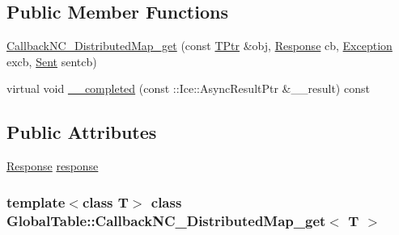 \subsection*{Public Member Functions}
\begin{DoxyCompactItemize}
\item 
\hyperlink{class_global_table_1_1_callback_n_c___distributed_map__get_a09d91d4925eca625514499fd0e8b9c0e}{CallbackNC\_\-DistributedMap\_\-get} (const \hyperlink{class_global_table_1_1_callback_n_c___distributed_map__get_a292c63a092a90c360da327d6157fb137}{TPtr} \&obj, \hyperlink{class_global_table_1_1_callback_n_c___distributed_map__get_a6b02991617c30d649770987cc7d959d9}{Response} cb, \hyperlink{class_global_table_1_1_callback_n_c___distributed_map__get_a126db6802d2d4a7493339ff578a55dbd}{Exception} excb, \hyperlink{class_global_table_1_1_callback_n_c___distributed_map__get_adafce4dc5804233cd3b7653cf69f5be6}{Sent} sentcb)
\item 
virtual void \hyperlink{class_global_table_1_1_callback_n_c___distributed_map__get_a636789ca8e06afc266d57e8a7e6681bd}{\_\-\_\-completed} (const ::Ice::AsyncResultPtr \&\_\-\_\-result) const 
\end{DoxyCompactItemize}
\subsection*{Public Attributes}
\begin{DoxyCompactItemize}
\item 
\hyperlink{class_global_table_1_1_callback_n_c___distributed_map__get_a6b02991617c30d649770987cc7d959d9}{Response} \hyperlink{class_global_table_1_1_callback_n_c___distributed_map__get_a87468610207b42c22393a5e8eb154b3d}{response}
\end{DoxyCompactItemize}
\subsubsection*{template$<$class T$>$ class GlobalTable::CallbackNC\_\-DistributedMap\_\-get$<$ T $>$}



